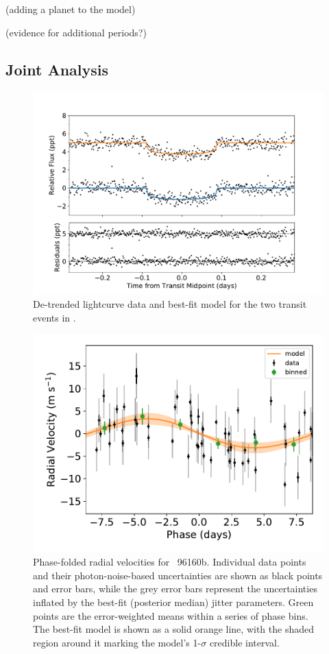 \documentclass[modern]{aastex62}
\newcommand{\plname}{\acronym{HIP}\ 96160b\xspace}
\begin{document}
(adding a planet to the model)

(evidence for additional periods?)

\subsection{Joint Analysis}
\label{s:analysis:joint}

\begin{figure}
    \centering
    \includegraphics[width=\textwidth]{transits.pdf}
    \caption{De-trended lightcurve data and best-fit model for the two transit events in \TESS.}
    \label{fig:transits}
\end{figure}

\begin{figure}
    \centering
    \includegraphics[width=16cm]{rvphased_1pl_wfwhm}
    \caption{Phase-folded radial velocities for \plname. Individual data points and their photon-noise-based uncertainties are shown as black points and error bars, while the grey error bars represent the uncertainties inflated by the best-fit (posterior median) jitter parameters. Green points are the error-weighted means within a series of phase bins. The best-fit model is shown as a solid orange line, with the shaded region around it marking the model's 1-$\sigma$ credible interval.}
    \label{fig:rv_phased}
\end{figure}
\end{document}
